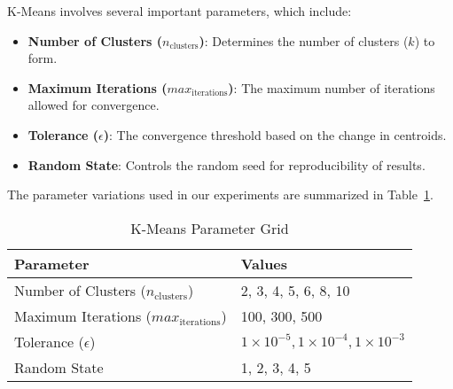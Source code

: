 K-Means involves several important parameters, which include:

\begin{itemize}
    \item \textbf{Number of Clusters (\(n_{\text{clusters}}\))}: Determines the number of clusters (\(k\)) to form.
    \item \textbf{Maximum Iterations (\(max_{\text{iterations}}\))}: The maximum number of iterations allowed for convergence.
    \item \textbf{Tolerance (\(\epsilon\))}: The convergence threshold based on the change in centroids.
    \item \textbf{Random State}: Controls the random seed for reproducibility of results.
\end{itemize}

The parameter variations used in our experiments are summarized in Table~\ref{tab:kmeans-param-grid}.

\begin{table}[h!]
\centering
\caption{K-Means Parameter Grid}
\label{tab:kmeans-param-grid}
\begin{tabularx}{\columnwidth}{|X|X|}
\hline
\textbf{Parameter} & \textbf{Values} \\ \hline
Number of Clusters (\(n_{\text{clusters}}\)) & 2, 3, 4, 5, 6, 8, 10 \\ \hline
Maximum Iterations (\(max_{\text{iterations}}\)) & 100, 300, 500 \\ \hline
Tolerance (\(\epsilon\)) & \(1 \times 10^{-5}, 1 \times 10^{-4}, 1 \times 10^{-3}\) \\ \hline
Random State & 1, 2, 3, 4, 5 \\ \hline
\end{tabularx}
\end{table}
